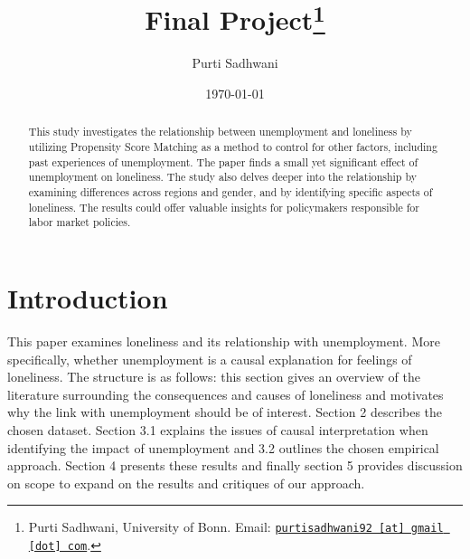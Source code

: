 \documentclass[11pt, a4paper, leqno]{article}
\begin{document}
\title{Final Project\thanks{Purti Sadhwani, University of Bonn. Email: \href{mailto:purtisadhwani92@gmail.com}{\nolinkurl{purtisadhwani92 [at] gmail [dot] com}}.}}

\author{Purti Sadhwani}

\date{
    \today
}

\maketitle


\begin{abstract}
    This study investigates the relationship between unemployment and loneliness by utilizing Propensity Score Matching as a method to control for other factors, including past experiences of unemployment. The  paper finds a small yet significant effect of unemployment on loneliness. The study also delves deeper into the relationship by examining differences across regions and gender, and by identifying specific aspects of loneliness. The results could offer valuable insights for policymakers responsible for labor market policies.
\end{abstract}

\clearpage


\section{Introduction} %
\label{sec:introduction}

This paper examines loneliness and its relationship with unemployment. More specifically, whether unemployment is a causal explanation for feelings of loneliness. The structure is as follows: this section gives an overview of the literature surrounding the consequences and causes of loneliness and motivates why the link with unemployment should be of interest. Section 2 describes the chosen dataset. Section 3.1 explains the issues of causal interpretation when identifying the impact of unemployment and 3.2 outlines the chosen empirical approach. Section 4 presents these results and finally section 5 provides discussion on scope to expand on the results and critiques of our approach.
\end{document}
